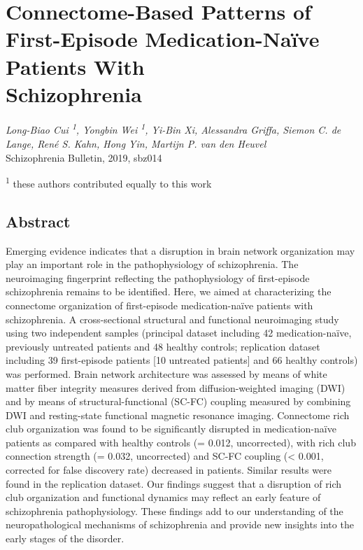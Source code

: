 \pagestyle{MyStyle}

\chapter[Connectome in first-episode Medication-Naïve schizophrenia]{Connectome-Based Patterns of First-Episode Medication-Na\"{i}ve Patients With \\Schizophrenia}
\label{ch:fourthpaper}

\begin{refsection}

\begin{flushright}
\textit{Long-Biao Cui \textsuperscript{1}, Yongbin Wei \textsuperscript{1}, Yi-Bin Xi, Alessandra Griffa, Siemon C. de Lange, René S. Kahn, Hong Yin, Martijn P. van den Heuvel}\\
Schizophrenia Bulletin, 2019, sbz014

\vspace{5 mm}

\textsuperscript{1} these authors contributed equally to this work\\

\vspace{7 mm}

\end{flushright}

\newpage
\section*{Abstract}
Emerging evidence indicates that a disruption in brain network organization may play an important role in the pathophysiology of schizophrenia. The neuroimaging fingerprint reflecting the pathophysiology of first-episode schizophrenia remains to be identified. Here, we aimed at characterizing the connectome organization of first-episode medication-na\"{i}ve patients with schizophrenia. A cross-sectional structural and functional neuroimaging study using two independent samples (principal dataset including 42 medication-na\"{i}ve, previously untreated patients and 48 healthy controls; replication dataset including 39 first-episode patients [10 untreated patients] and 66 healthy controls) was performed. Brain network architecture was assessed by means of white matter fiber integrity measures derived from diffusion-weighted imaging (DWI) and by means of structural-functional (SC-FC) coupling measured by combining DWI and resting-state functional magnetic resonance imaging. Connectome rich club organization was found to be significantly disrupted in medication-na\"{i}ve patients as compared with healthy controls (\pval = 0.012, uncorrected), with rich club connection strength (\pval = 0.032, uncorrected) and SC-FC coupling (\pval < 0.001, corrected for false discovery rate) decreased in patients. Similar results were found in the replication dataset. Our findings suggest that a disruption of rich club organization and functional dynamics may reflect an early feature of schizophrenia pathophysiology. These findings add to our understanding of the neuropathological mechanisms of schizophrenia and provide new insights into the early stages of the disorder.


\end{refsection}
